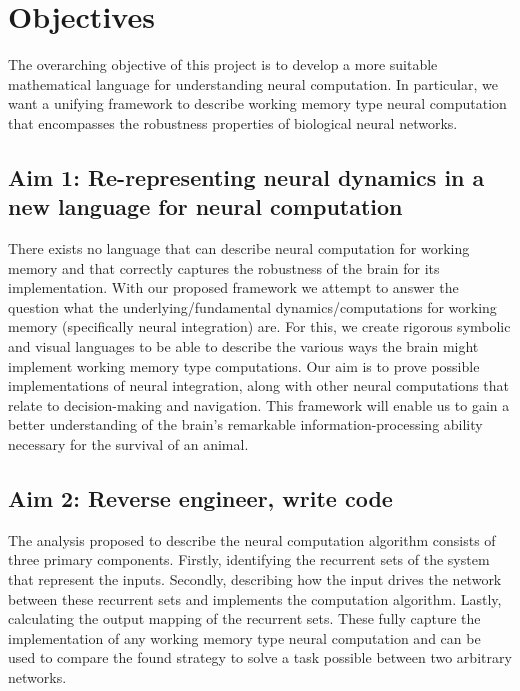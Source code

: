 \documentclass[12pt,letterpaper, onecolumn]{article}
\theoremstyle{definition}
\theoremstyle{remark}
\begin{document}
%


\newpage
\section{Objectives}
The overarching objective of this project is to develop a more suitable mathematical language for understanding neural computation. In particular, we want a unifying framework to describe working memory type neural computation that encompasses the robustness properties of biological neural networks.

\subsection*{Aim 1: Re-representing neural dynamics in a new language for neural computation}
There exists no language that can describe neural computation for working memory and that  correctly captures the robustness of the brain for its implementation. With our proposed framework we attempt to answer the question what the underlying/fundamental dynamics/computations for working memory (specifically neural integration) are. For this, we create rigorous symbolic and visual languages to be able to describe the various ways the brain might implement working memory type computations. Our aim is to prove possible implementations of neural integration, along with other neural computations that relate to decision-making and navigation. This framework will enable us to gain a better understanding of the brain's remarkable information-processing ability necessary for the survival of an animal. 



\subsection*{Aim 2: Reverse engineer, write code}
The analysis proposed to describe the neural computation algorithm consists of three primary components. Firstly, identifying the recurrent sets of the system that represent the inputs. Secondly, describing how the input drives the network between these recurrent sets and implements the computation algorithm. Lastly, calculating the output mapping of the recurrent sets.
These fully capture the implementation of any working memory type neural computation and can be used to compare the found strategy to solve a task possible between two arbitrary networks.
\end{document}
